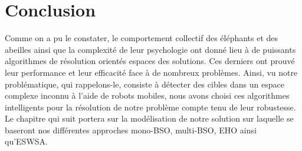 \section{Conclusion}
Comme on a pu le constater, le comportement collectif des éléphants et des abeilles ainsi que la complexité de leur psychologie ont donné lieu à de puissants algorithmes de résolution orientés espaces des solutions. Ces derniers ont prouvé leur performance et leur efficacité face à de nombreux problèmes.
Ainsi, vu notre problématique, qui rappelons-le, consiste à détecter des cibles dans un espace complexe inconnu à l'aide de robots mobiles, nous avons choisi ces algorithmes intelligents pour la
résolution de notre problème compte tenu de leur robustesse. Le chapitre qui suit portera sur la modélisation de notre solution sur laquelle se baseront nos différentes approches mono-BSO, multi-BSO, EHO ainsi qu'ESWSA.



